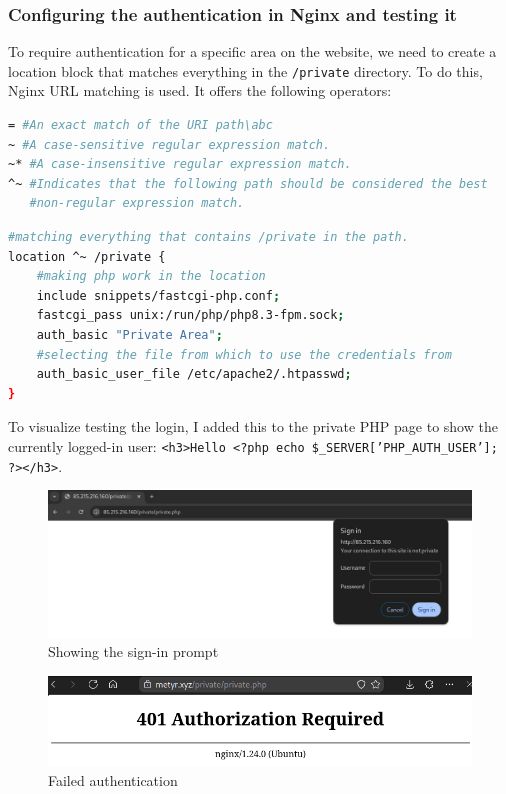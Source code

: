 \documentclass[a4paper]{article}
\newcommand{\abc}{\hfill \break}
\begin{document}
\subsubsection{Configuring the authentication in Nginx and testing it}
To require authentication for a specific area on the website, we need to create a location block that matches everything in the \texttt{/private} directory. To do this, Nginx URL matching is used.\cite{Nginx-url-matching}\abc
It offers the following operators:
\begin{lstlisting}[language=bash]
= #An exact match of the URI path\abc
~ #A case-sensitive regular expression match.
~* #A case-insensitive regular expression match.
^~ #Indicates that the following path should be considered the best
   #non-regular expression match.
\end{lstlisting}
\begin{lstlisting}[language=bash]
#matching everything that contains /private in the path.
location ^~ /private {
	#making php work in the location
	include snippets/fastcgi-php.conf;
	fastcgi_pass unix:/run/php/php8.3-fpm.sock;
	auth_basic "Private Area";
	#selecting the file from which to use the credentials from
	auth_basic_user_file /etc/apache2/.htpasswd;
}
\end{lstlisting}
To visualize testing the login, I added this to the private PHP page to show the currently logged-in user: \texttt{<h3>Hello <?php echo \$\_SERVER['PHP\_AUTH\_USER']; ?></h3>}.\cite{php-show-basic-auth}
\newpage
\begin{figure}[!htbp]
	\includegraphics[scale=0.25]{images/siginprompt.png}
	\centering
	\caption{Showing the sign-in prompt}
\end{figure}
\begin{figure}[!htbp]
	\includegraphics[scale=0.38]{images/noauth.png}
	\centering
	\caption{Failed authentication}
\end{figure}
\end{document}
